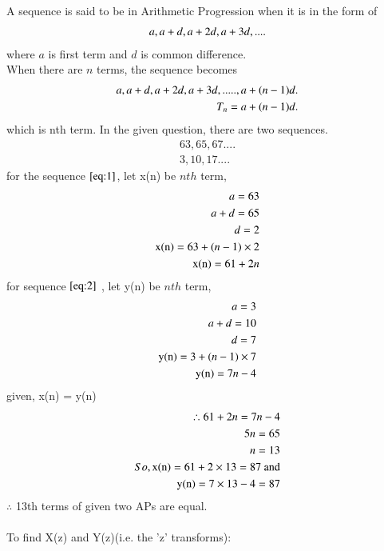 \documentclass[journal,12pt,twocolumn]{IEEEtran}
\theoremstyle{remark}
\begin{document}
A sequence is said to be in Arithmetic Progression when it is in the form of
\begin{align}
\notag a, a+d, a+2d, a+3d,....
\end{align}
where $a$ is first term and $d$ is common difference.\\
When there are $ n$ terms, the sequence becomes
\begin{align}
\notag a, a+d, a+2d, a+3d,....., a+(n-1)d.\\
\notag T_n = a+(n-1)d.
\end{align}
which is nth term.
In the given question, there are two sequences.
\begin{align}
63, 65, 67....\label{eq:1}\\
3, 10, 17....\label{eq:2}
\end{align}
for the sequence $ \eqref{eq:1}$, let x(n) be $ nth$ term,
\begin{align}
\notag a = 63\\
\notag a+d = 65\\
\notag d = 2\\
\notag \text{x(n)} = 63 + (n-1)\times2\\
\text{x(n)} = 61 + 2n \label{eq:3}
\end{align}
for sequence $ \eqref{eq:2}$ , let y(n) be $ nth$ term,
\begin{align}
\notag a = 3 \\
\notag a+d = 10\\
\notag d = 7\\
\notag \text{y(n)} = 3 + (n-1)\times7\\
\text{y(n)} = 7n - 4 \label{eq:4}
\end{align}
given, x(n) = y(n)\\
\begin{align}
\therefore 61 + 2n = 7n -4\\
\notag 5n = 65\\
n = 13\\
\notag So, \text{x(n)} = 61 + 2\times13 = 87 \text{ and}\\
\notag \text{y(n)} = 7\times13 - 4 = 87
\end{align}
$ \therefore$ 13th terms of given two APs are equal.\\\\
\vspace{0.5cm}
To find X(z) and Y(z)(i.e. the 'z' transforms):\\
\end{document}
